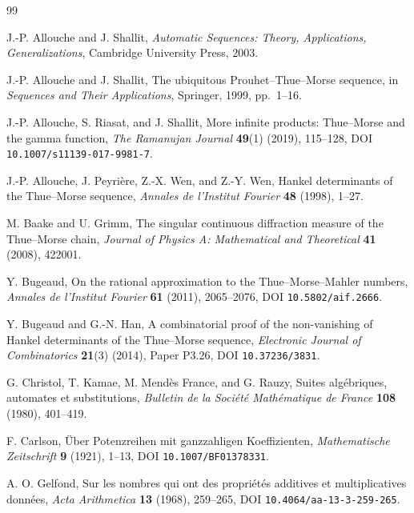 \documentclass[11pt,oneside]{article}
\theoremstyle{definition}
\theoremstyle{remark}
\begin{document}
\begin{thebibliography}{99}

J.-P. Allouche and J. Shallit,
\emph{Automatic Sequences: Theory, Applications, Generalizations},
Cambridge University Press, 2003.

J.-P. Allouche and J. Shallit,
The ubiquitous Prouhet--Thue--Morse sequence,
in \emph{Sequences and Their Applications}, Springer, 1999, pp.~1--16.

J.-P. Allouche, S. Riasat, and J. Shallit,
More infinite products: Thue--Morse and the gamma function,
\emph{The Ramanujan Journal} \textbf{49}(1) (2019), 115--128,
DOI \nolinkurl{10.1007/s11139-017-9981-7}.

J.-P. Allouche, J. Peyri\`ere, Z.-X. Wen, and Z.-Y. Wen,
Hankel determinants of the Thue--Morse sequence,
\emph{Annales de l'Institut Fourier} \textbf{48} (1998), 1--27.

M. Baake and U. Grimm,
The singular continuous diffraction measure of the Thue--Morse chain,
\emph{Journal of Physics A: Mathematical and Theoretical}
\textbf{41} (2008), 422001.

Y. Bugeaud,
On the rational approximation to the Thue--Morse--Mahler numbers,
\emph{Annales de l'Institut Fourier} \textbf{61} (2011), 2065--2076,
DOI \nolinkurl{10.5802/aif.2666}.

Y. Bugeaud and G.-N. Han,
A combinatorial proof of the non-vanishing of Hankel determinants of the
Thue--Morse sequence,
\emph{Electronic Journal of Combinatorics} \textbf{21}(3) (2014), Paper P3.26,
DOI \nolinkurl{10.37236/3831}.

G. Christol, T. Kamae, M. Mend\`es France, and G. Rauzy,
Suites alg\'ebriques, automates et substitutions,
\emph{Bulletin de la Soci\'et\'e Math\'ematique de France}
\textbf{108} (1980), 401--419.

F. Carlson,
\"Uber Potenzreihen mit ganzzahligen Koeffizienten,
\emph{Mathematische Zeitschrift} \textbf{9} (1921), 1--13,
DOI \nolinkurl{10.1007/BF01378331}.

A. O. Gelfond,
Sur les nombres qui ont des propri\'et\'es additives et multiplicatives donn\'ees,
\emph{Acta Arithmetica} \textbf{13} (1968), 259--265,
DOI \nolinkurl{10.4064/aa-13-3-259-265}.


\end{thebibliography}
\end{document}
